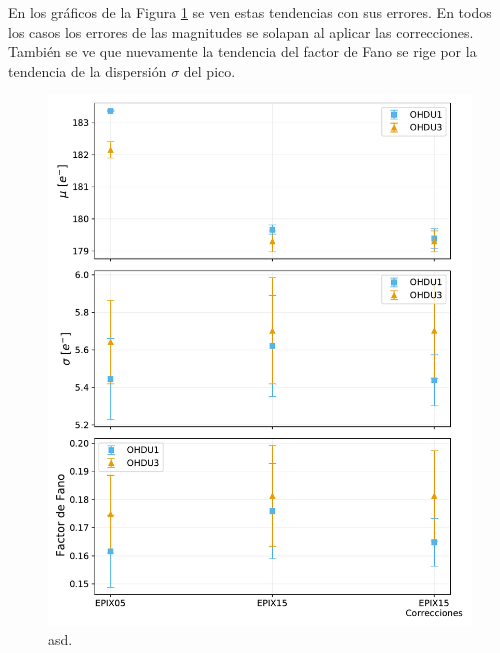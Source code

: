 En los gráficos de la Figura \ref{fig:F_mu_sigma_fano} se ven estas tendencias con sus errores. En todos los casos los errores de las magnitudes se solapan al aplicar las correcciones. También se ve que nuevamente la tendencia del factor de Fano se rige por la tendencia de la dispersión $\sigma$ del pico.
\begin{figure}[h]
    \centering
        \includegraphics[scale=0.5]{Figs/F_mu_sigma_fano.pdf}
    \caption{\footnotesize{asd.}}
    \label{fig:F_mu_sigma_fano}
\end{figure}

